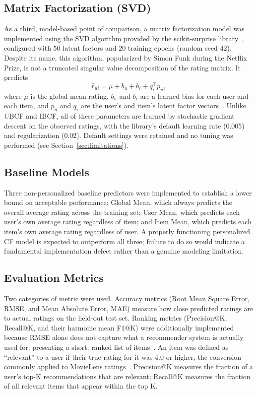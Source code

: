 \documentclass[conference]{IEEEtran}
\begin{document}
\subsection{Matrix Factorization (SVD)}
As a third, model-based point of comparison, a matrix factorization model was implemented using the SVD algorithm provided by the scikit-surprise library~\cite{hug2020}, configured with 50 latent factors and 20 training epochs (random seed 42). Despite its name, this algorithm, popularized by Simon Funk during the Netflix Prize, is not a truncated singular value decomposition of the rating matrix. It predicts
\begin{equation}
\hat{r}_{ui} = \mu + b_u + b_i + q_i^{\top} p_u,
\label{eq:svd}
\end{equation}
where $\mu$ is the global mean rating, $b_u$ and $b_i$ are a learned bias for each user and each item, and $p_u$ and $q_i$ are the user's and item's latent factor vectors~\cite{koren2009}. Unlike UBCF and IBCF, all of these parameters are learned by stochastic gradient descent on the observed ratings, with the library's default learning rate (0.005) and regularization (0.02). Default settings were retained and no tuning was performed (see Section~\ref{sec:limitations}).

\subsection{Baseline Models}
Three non-personalized baseline predictors were implemented to establish a lower bound on acceptable performance: Global Mean, which always predicts the overall average rating across the training set; User Mean, which predicts each user's own average rating regardless of item; and Item Mean, which predicts each item's own average rating regardless of user. A properly functioning personalized CF model is expected to outperform all three; failure to do so would indicate a fundamental implementation defect rather than a genuine modeling limitation.

\subsection{Evaluation Metrics}
Two categories of metric were used. Accuracy metrics (Root Mean Square Error, RMSE, and Mean Absolute Error, MAE) measure how close predicted ratings are to actual ratings on the held-out test set. Ranking metrics (Precision@K, Recall@K, and their harmonic mean F1@K) were additionally implemented because RMSE alone does not capture what a recommender system is actually used for: presenting a short, ranked list of items~\cite{cremonesi2010}. An item was defined as ``relevant'' to a user if their true rating for it was 4.0 or higher, the conversion commonly applied to MovieLens ratings~\cite{herlocker2004}. Precision@K measures the fraction of a user's top-K recommendations that are relevant; Recall@K measures the fraction of all relevant items that appear within the top K.
\end{document}
